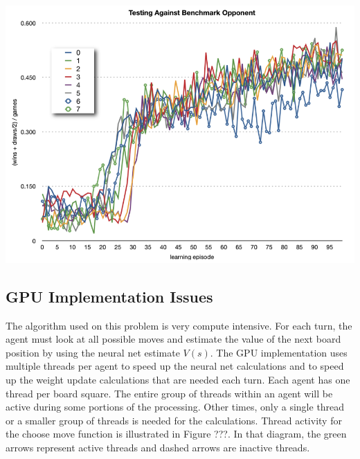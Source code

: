 \documentclass[11pt]{article} %
\begin{document}
\includegraphics[scale=0.8]{fig13}
\begin{flushleft}


\subsection{GPU Implementation Issues}
The algorithm used on this problem is very compute intensive.  For each turn, the agent must look at all possible moves and estimate the value of the next board position by using the neural net estimate $V(s)$.  The GPU implementation uses multiple threads per agent to speed up the neural net calculations and to speed up the weight update calculations that are needed each turn.  Each agent has one thread per board square.  The entire group of threads within an agent will be active during some portions of the processing.  Other times, only a single thread or a smaller group of threads is needed for the calculations.  Thread activity for the choose move function is illustrated in Figure ???.  In that diagram, the green arrows represent active threads and dashed arrows are inactive threads.

\end{flushleft}
\center
\end{document}
